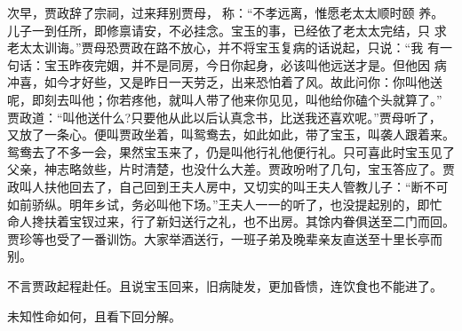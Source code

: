 次早，贾政辞了宗祠，过来拜别贾母，称：“不孝远离，惟愿老太太顺时颐
养。儿子一到任所，即修禀请安，不必挂念。宝玉的事，已经依了老太太完结，只
求老太太训诲。”贾母恐贾政在路不放心，并不将宝玉复病的话说起，只说：“我
有一句话：宝玉昨夜完姻，并不是同房，今日你起身，必该叫他远送才是。但他因
病冲喜，如今才好些，又是昨日一天劳乏，出来恐怕着了风。故此问你：你叫他送
呢，即刻去叫他；你若疼他，就叫人带了他来你见见，叫他给你磕个头就算了。”
贾政道：“叫他送什么?只要他从此以后认真念书，比送我还喜欢呢。”贾母听了，
又放了一条心。便叫贾政坐着，叫鸳鸯去，如此如此，带了宝玉，叫袭人跟着来。
鸳鸯去了不多一会，果然宝玉来了，仍是叫他行礼他便行礼。只可喜此时宝玉见了
父亲，神志略敛些，片时清楚，也没什么大差。贾政吩咐了几句，宝玉答应了。贾
政叫人扶他回去了，自己回到王夫人房中，又切实的叫王夫人管教儿子：“断不可
如前骄纵。明年乡试，务必叫他下场。”王夫人一一的听了，也没提起别的，即忙
命人搀扶着宝钗过来，行了新妇送行之礼，也不出房。其馀内眷俱送至二门而回。
贾珍等也受了一番训饬。大家举酒送行，一班子弟及晚辈亲友直送至十里长亭而
别。

不言贾政起程赴任。且说宝玉回来，旧病陡发，更加昏愦，连饮食也不能进了。

未知性命如何，且看下回分解。